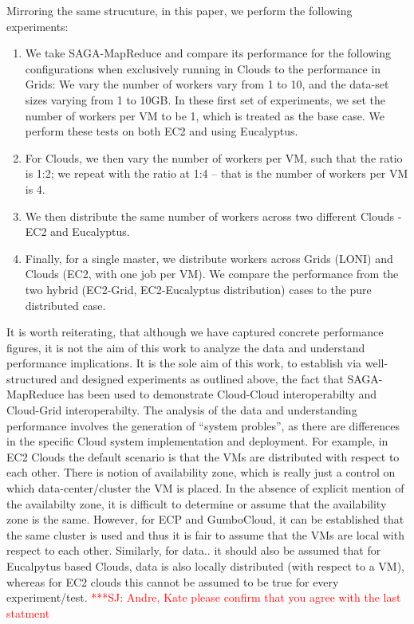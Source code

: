\documentclass[conference,final]{IEEEtran}
\newcommand{\jhanote}[1]{ {\textcolor{red} { ***SJ: #1 }}}
\newcommand{\jhanote}[1]{}
\newcommand{\sagamapreduce }{SAGA-MapReduce }
\begin{document}
Mirroring the same strucuture, in this paper, we perform the following
experiments:
\begin{enumerate}
\item We take \sagamapreduce and compare its performance for the
  following configurations when exclusively running in Clouds to the
  performance in Grids: We vary the number of workers vary from 1 to
  10, and the data-set sizes varying from 1 to 10GB.  In these first
  set of experiments, we set the number of workers per VM to be 1,
  which is treated as the base case.  We perform these tests on both
  EC2 and using Eucalyptus.
\item For Clouds, we then vary the number of workers per VM, such that
  the ratio is 1:2; we repeat with the ratio at 1:4 -- that is the
  number of workers per VM is 4.
\item We then distribute the same number of workers across two
  different Clouds - EC2 and Eucalyptus.
\item Finally, for a single master, we distribute workers across Grids
  (LONI) and Clouds (EC2, with one job per VM). We compare the
  performance from the two hybrid (EC2-Grid, EC2-Eucalyptus
  distribution) cases to the pure distributed case.
\end{enumerate}

It is worth reiterating, that although we have captured concrete
performance figures, it is not the aim of this work to analyze the
data and understand performance implications. It is the sole aim of
this work, to establish via well-structured and designed experiments
as outlined above, the fact that \sagamapreduce has been used to
demonstrate Cloud-Cloud interoperabilty and Cloud-Grid
interoperabilty.  The analysis of the data and understanding
performance involves the generation of ``system probles'', as there
are differences in the specific Cloud system implementation and
deployment. For example, in EC2 Clouds the default scenario is that
the VMs are distributed with respect to each other. There is notion of
availability zone, which is really just a control on which
data-center/cluster the VM is placed. In the absence of explicit
mention of the availabilty zone, it is difficult to determine or
assume that the availability zone is the same. However, for ECP and
GumboCloud, it can be established that the same cluster is used and
thus it is fair to assume that the VMs are local with respect to each
other.  Similarly, for data.. it should also be assumed that for
Eucalpytus based Clouds, data is also locally distributed (with
respect to a VM), whereas for EC2 clouds this cannot be assumed to be
true for every experiment/test. \jhanote{Andre, Kate please confirm
  that you agree with the last statment}
\end{document}
